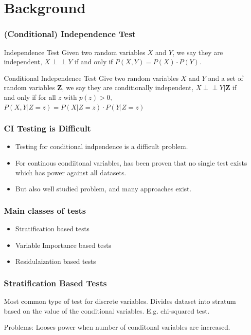 \documentclass{beamer}
\def\ci{\perp\!\!\!\!\!\perp}
\begin{document}
\section{Background}
\begin{frame}
	\frametitle{(Conditional) Independence Test}
	\begin{block}{Independence Test}
		Given two random variables $ X $ and $ Y $, we say they are independent,
		$ X \ci Y $ if and only if $ P(X, Y) = P(X) \cdot P(Y) $.

	\end{block}

	\begin{block}{Conditional Independence Test}
		Give two random variables $ X $ and $ Y $ and a set of random
		variables $ \bm{Z} $, we say they are conditionally
		independent, $ X \ci Y | \bm{Z} $ if and only if for all $ z $ with
		$ p(z) > 0 $, $ P(X, Y | Z=z) = P(X | Z=z) \cdot P(Y | Z=z) $

	\end{block}
\end{frame}

\begin{frame}
	\frametitle{CI Testing is Difficult}
	\begin{itemize}
		\item Testing for conditional indpendence is a difficult problem.
		\item For continous condiitonal variables, has been proven that no single 
		      test exists which has power against all datasets.
		\item But also well studied problem, and many approaches exist.
	\end{itemize}
\end{frame}

\begin{frame}
	\frametitle{Main classes of tests}
	\begin{itemize}
		\item Stratification based tests
		\item Variable Importance based tests
		\item Residulaization based tests
	\end{itemize}
\end{frame}

\begin{frame}
	\frametitle{Stratification Based Tests}
	Most common type of test for discrete variables.
	Divides dataset into stratum based on the value of the conditional
	variables. E.g. chi-squared test.

	Problems: Looses power when number of conditonal variables are increased.
\end{frame}
\end{document}
